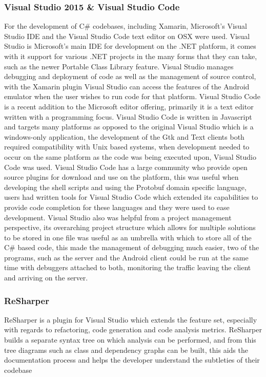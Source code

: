 \documentclass{article}
\begin{document}
\subsubsection{Visual Studio 2015 \& Visual Studio Code}
For the development of C\# codebases, including Xamarin, Microsoft’s Visual Studio IDE and the Visual Studio Code text editor on OSX were used. Visual Studio is Microsoft's main IDE for development on the .NET platform, it comes with it support for various .NET projects in the many forms that they can take, such as the newer Portable Class Library feature. Visual Studio manages debugging and deployment of code as well as the management of source control, with the Xamarin plugin Visual Studio can access the features of the Android emulator when the user wishes to run code for that platform. Visual Studio Code is a recent addition to the Microsoft editor offering, primarily it is a text editor written with a programming focus. Visual Studio Code is written in Javascript and targets many platforms as opposed to the original Visual Studio which is a windows-only application, the development of the Gtk and Text clients both required compatibility with Unix based systems, when development needed to occur on the same platform as the code was being executed upon, Visual Studio Code was used. Visual Studio Code has a large community who provide open source plugins for download and use on the platform, this was useful when developing the shell scripts and using the Protobuf domain specific language, users had written tools for Visual Studio Code which extended its capabilities to provide code completion for these languages and they were used to ease development. Visual Studio also was helpful from a project management perspective, its overarching project structure which allows for multiple solutions to be stored in one file was useful as an umbrella with which to store all of the C\# based code, this made the management of debugging much easier, two of the programs, such as the server and the Android client could be run at the same time with debuggers attached to both, monitoring the traffic leaving the client and arriving on the server.
\subsubsection{ReSharper}
ReSharper is a plugin for Visual Studio which extends the feature set, especially with regards to refactoring, code generation and code analysis metrics. ReSharper builds a separate syntax tree on which analysis can be performed, and from this tree diagrams such as class and dependency graphs can be built, this aids the documentation process and helps the developer understand the subtleties of their codebase
\end{document}
